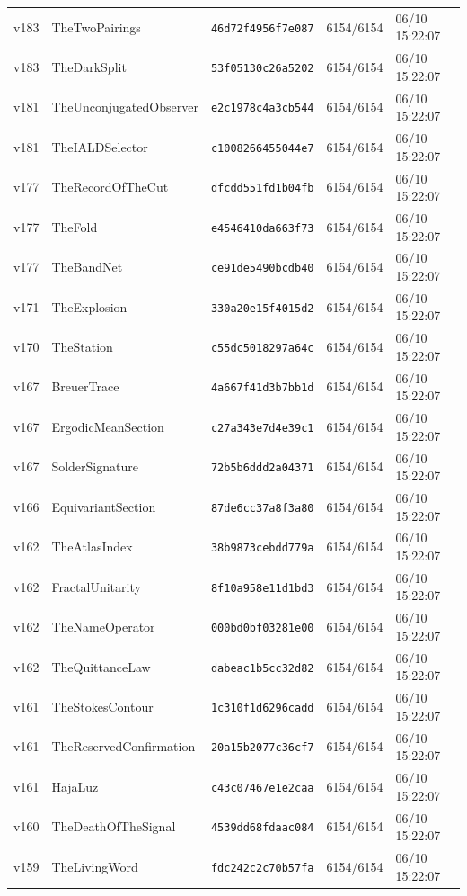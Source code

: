\documentclass[11pt]{article}
\theoremstyle{definition}\newtheorem{deriv}{Derivação}
\begin{document}
{\begin{longtable}{@{}lllll@{}}
v183 & TheTwoPairings & \texttt{46d72f4956f7e087} & 6154/6154 & 06/10 15:22:07 \\
v183 & TheDarkSplit & \texttt{53f05130c26a5202} & 6154/6154 & 06/10 15:22:07 \\
v181 & TheUnconjugatedObserver & \texttt{e2c1978c4a3cb544} & 6154/6154 & 06/10 15:22:07 \\
v181 & TheIALDSelector & \texttt{c1008266455044e7} & 6154/6154 & 06/10 15:22:07 \\
v177 & TheRecordOfTheCut & \texttt{dfcdd551fd1b04fb} & 6154/6154 & 06/10 15:22:07 \\
v177 & TheFold & \texttt{e4546410da663f73} & 6154/6154 & 06/10 15:22:07 \\
v177 & TheBandNet & \texttt{ce91de5490bcdb40} & 6154/6154 & 06/10 15:22:07 \\
v171 & TheExplosion & \texttt{330a20e15f4015d2} & 6154/6154 & 06/10 15:22:07 \\
v170 & TheStation & \texttt{c55dc5018297a64c} & 6154/6154 & 06/10 15:22:07 \\
v167 & BreuerTrace & \texttt{4a667f41d3b7bb1d} & 6154/6154 & 06/10 15:22:07 \\
v167 & ErgodicMeanSection & \texttt{c27a343e7d4e39c1} & 6154/6154 & 06/10 15:22:07 \\
v167 & SolderSignature & \texttt{72b5b6ddd2a04371} & 6154/6154 & 06/10 15:22:07 \\
v166 & EquivariantSection & \texttt{87de6cc37a8f3a80} & 6154/6154 & 06/10 15:22:07 \\
v162 & TheAtlasIndex & \texttt{38b9873cebdd779a} & 6154/6154 & 06/10 15:22:07 \\
v162 & FractalUnitarity & \texttt{8f10a958e11d1bd3} & 6154/6154 & 06/10 15:22:07 \\
v162 & TheNameOperator & \texttt{000bd0bf03281e00} & 6154/6154 & 06/10 15:22:07 \\
v162 & TheQuittanceLaw & \texttt{dabeac1b5cc32d82} & 6154/6154 & 06/10 15:22:07 \\
v161 & TheStokesContour & \texttt{1c310f1d6296cadd} & 6154/6154 & 06/10 15:22:07 \\
v161 & TheReservedConfirmation & \texttt{20a15b2077c36cf7} & 6154/6154 & 06/10 15:22:07 \\
v161 & HajaLuz & \texttt{c43c07467e1e2caa} & 6154/6154 & 06/10 15:22:07 \\
v160 & TheDeathOfTheSignal & \texttt{4539dd68fdaac084} & 6154/6154 & 06/10 15:22:07 \\
v159 & TheLivingWord & \texttt{fdc242c2c70b57fa} & 6154/6154 & 06/10 15:22:07 \\

\end{longtable}}
\end{document}
